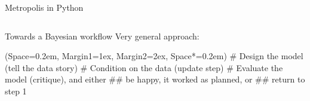 \documentclass[12pt, aspectratio=149]{beamer}
\newcommand{\listSpace}{0.2em}
\theoremstyle{plain}
\begin{document}
\begin{frame}[fragile]{Metropolis in Python}
	\inputminted[fontsize=\tiny]{python}{../metropolis.py}
\end{frame}

\begin{frame}[fragile]{Towards a Bayesian workflow}
	Very general approach:
	\begin{easylist}[enumerate]
		\ListProperties(Space=\listSpace, Margin1=1ex, Margin2=2ex, Space*=\listSpace)
		# Design the model (tell the data story)
		# Condition on the data (update step)
		# Evaluate the model (critique), and either
		## be happy, it worked as planned, or
		## return to step 1
	\end{easylist}
\end{frame}
\end{document}
